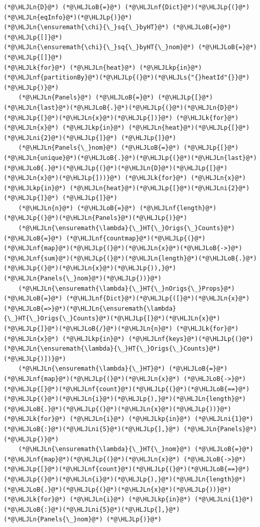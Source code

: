 \documentclass[12pt,a4paper]{article}
\newcommand{\HLJLk}[1]{\textcolor[RGB]{148,91,176}{\textbf{#1}}}
\newcommand{\HLJLkp}[1]{\textcolor[RGB]{148,91,176}{\textbf{#1}}}
\newcommand{\HLJLn}[1]{#1}
\newcommand{\HLJLnf}[1]{\textcolor[RGB]{66,102,213}{#1}}
\newcommand{\HLJLs}[1]{\textcolor[RGB]{201,61,57}{#1}}
\newcommand{\HLJLni}[1]{\textcolor[RGB]{59,151,46}{#1}}
\newcommand{\HLJLoB}[1]{\textcolor[RGB]{102,102,102}{\textbf{#1}}}
\newcommand{\HLJLp}[1]{#1}
\begin{document}
\begin{lstlisting}
(*@\HLJLn{D}@*) (*@\HLJLoB{=}@*) (*@\HLJLnf{Dict}@*)(*@\HLJLp{(}@*)(*@\HLJLn{eqInfo}@*)(*@\HLJLp{)}@*)
(*@\HLJLn{\ensuremath{\chi}{\_}sq{\_}byHT}@*) (*@\HLJLoB{=}@*) (*@\HLJLp{[]}@*)
(*@\HLJLn{\ensuremath{\chi}{\_}sq{\_}byHT{\_}nom}@*) (*@\HLJLoB{=}@*) (*@\HLJLp{[]}@*)
(*@\HLJLk{for}@*) (*@\HLJLn{heat}@*) (*@\HLJLkp{in}@*) (*@\HLJLnf{partitionBy}@*)(*@\HLJLp{(}@*)(*@\HLJLs{"{}heatId"{}}@*)(*@\HLJLp{)}@*)
	(*@\HLJLn{Panels}@*) (*@\HLJLoB{=}@*) (*@\HLJLp{[}@*) (*@\HLJLn{last}@*)(*@\HLJLoB{.}@*)(*@\HLJLp{(}@*)(*@\HLJLn{D}@*)(*@\HLJLp{[}@*)(*@\HLJLn{x}@*)(*@\HLJLp{])}@*) (*@\HLJLk{for}@*) (*@\HLJLn{x}@*) (*@\HLJLkp{in}@*) (*@\HLJLn{heat}@*)(*@\HLJLp{[}@*)(*@\HLJLni{2}@*)(*@\HLJLp{]}@*) (*@\HLJLp{]}@*)
	(*@\HLJLn{Panels{\_}nom}@*) (*@\HLJLoB{=}@*) (*@\HLJLp{[}@*) (*@\HLJLn{unique}@*)(*@\HLJLoB{.}@*)(*@\HLJLp{(}@*)(*@\HLJLn{last}@*)(*@\HLJLoB{.}@*)(*@\HLJLp{(}@*)(*@\HLJLn{D}@*)(*@\HLJLp{[}@*)(*@\HLJLn{x}@*)(*@\HLJLp{]))}@*) (*@\HLJLk{for}@*) (*@\HLJLn{x}@*) (*@\HLJLkp{in}@*) (*@\HLJLn{heat}@*)(*@\HLJLp{[}@*)(*@\HLJLni{2}@*)(*@\HLJLp{]}@*) (*@\HLJLp{]}@*)
	(*@\HLJLn{n}@*) (*@\HLJLoB{=}@*) (*@\HLJLnf{length}@*)(*@\HLJLp{(}@*)(*@\HLJLn{Panels}@*)(*@\HLJLp{)}@*)
	(*@\HLJLn{\ensuremath{\lambda}{\_}HT{\_}Origs{\_}Counts}@*) (*@\HLJLoB{=}@*) (*@\HLJLnf{countmap}@*)(*@\HLJLp{(}@*) (*@\HLJLnf{map}@*)(*@\HLJLp{(}@*)(*@\HLJLn{x}@*)(*@\HLJLoB{->}@*)(*@\HLJLnf{sum}@*)(*@\HLJLp{(}@*)(*@\HLJLn{length}@*)(*@\HLJLoB{.}@*)(*@\HLJLp{(}@*)(*@\HLJLn{x}@*)(*@\HLJLp{)),}@*) (*@\HLJLn{Panels{\_}nom}@*)(*@\HLJLp{))}@*)
	(*@\HLJLn{\ensuremath{\lambda}{\_}HT{\_}nOrigs{\_}Props}@*) (*@\HLJLoB{=}@*) (*@\HLJLnf{Dict}@*)(*@\HLJLp{([}@*)(*@\HLJLn{x}@*)(*@\HLJLoB{=>}@*)(*@\HLJLn{\ensuremath{\lambda}{\_}HT{\_}Origs{\_}Counts}@*)(*@\HLJLp{[}@*)(*@\HLJLn{x}@*)(*@\HLJLp{]}@*)(*@\HLJLoB{/}@*)(*@\HLJLn{n}@*) (*@\HLJLk{for}@*) (*@\HLJLn{x}@*) (*@\HLJLkp{in}@*) (*@\HLJLnf{keys}@*)(*@\HLJLp{(}@*)(*@\HLJLn{\ensuremath{\lambda}{\_}HT{\_}Origs{\_}Counts}@*)(*@\HLJLp{)])}@*)
	(*@\HLJLn{\ensuremath{\lambda}{\_}HT}@*) (*@\HLJLoB{=}@*) (*@\HLJLnf{map}@*)(*@\HLJLp{(}@*)(*@\HLJLn{x}@*) (*@\HLJLoB{->}@*) (*@\HLJLp{[}@*)(*@\HLJLnf{count}@*)(*@\HLJLp{(}@*)(*@\HLJLoB{==}@*)(*@\HLJLp{(}@*)(*@\HLJLn{i}@*)(*@\HLJLp{),}@*)(*@\HLJLn{length}@*)(*@\HLJLoB{.}@*)(*@\HLJLp{(}@*)(*@\HLJLn{x}@*)(*@\HLJLp{))}@*) (*@\HLJLk{for}@*) (*@\HLJLn{i}@*) (*@\HLJLkp{in}@*) (*@\HLJLni{1}@*)(*@\HLJLoB{:}@*)(*@\HLJLni{5}@*)(*@\HLJLp{],}@*) (*@\HLJLn{Panels}@*) (*@\HLJLp{)}@*)
	(*@\HLJLn{\ensuremath{\lambda}{\_}HT{\_}nom}@*) (*@\HLJLoB{=}@*) (*@\HLJLnf{map}@*)(*@\HLJLp{(}@*)(*@\HLJLn{x}@*) (*@\HLJLoB{->}@*) (*@\HLJLp{[}@*)(*@\HLJLnf{count}@*)(*@\HLJLp{(}@*)(*@\HLJLoB{==}@*)(*@\HLJLp{(}@*)(*@\HLJLn{i}@*)(*@\HLJLp{),}@*)(*@\HLJLn{length}@*)(*@\HLJLoB{.}@*)(*@\HLJLp{(}@*)(*@\HLJLn{x}@*)(*@\HLJLp{))}@*) (*@\HLJLk{for}@*) (*@\HLJLn{i}@*) (*@\HLJLkp{in}@*) (*@\HLJLni{1}@*)(*@\HLJLoB{:}@*)(*@\HLJLni{5}@*)(*@\HLJLp{],}@*) (*@\HLJLn{Panels{\_}nom}@*) (*@\HLJLp{)}@*)

\end{lstlisting}
\end{document}
